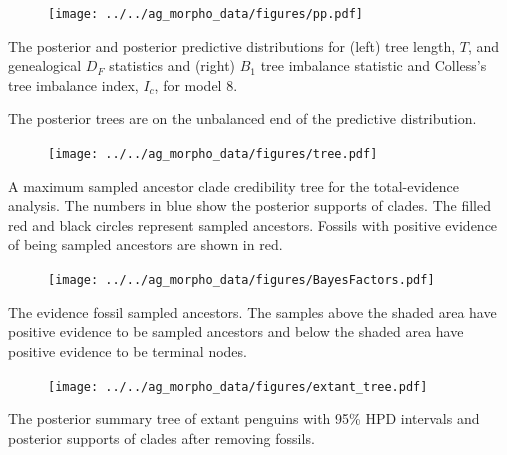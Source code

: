 
\begin{frame}
\begin{figure}
\texttt{[image: ../../ag\_morpho\_data/figures/pp.pdf]}
\label{postPredictive}
\end{figure}
\small{The posterior and posterior predictive distributions for (left) tree length, $T$, and genealogical $D_F$ statistics and (right) $B_1$ tree imbalance statistic and Colless's tree imbalance index, $I_c$, for model 8. 

The posterior trees are on the unbalanced end of the predictive distribution.}
\end{frame}


\begin{frame}
\begin{figure}
\texttt{[image: ../../ag\_morpho\_data/figures/tree.pdf]}
\label{penguinTree}
\end{figure}
\footnotesize{A maximum sampled ancestor clade credibility tree for the total-evidence analysis. %
The numbers in blue show the posterior supports of clades. The filled red and black circles represent sampled 
ancestors. Fossils with positive evidence of being sampled ancestors are shown in red.}

\end{frame}


\begin{frame}
\begin{figure}
\begin{center}
\texttt{[image: ../../ag\_morpho\_data/figures/BayesFactors.pdf]}
\label{fig:BF}
\end{center}
\end{figure}
\small{The evidence fossil sampled ancestors. The samples above the shaded area have positive evidence to be sampled ancestors and below the shaded area have positive evidence to be terminal nodes.}

\end{frame}


\begin{frame}
\begin{figure}
\texttt{[image: ../../ag\_morpho\_data/figures/extant\_tree.pdf]}
\label{fig:divDates}
\end{figure}
\small{The posterior summary tree of extant penguins with 95\% HPD intervals and
posterior supports of clades after removing fossils.}
\end{frame}

